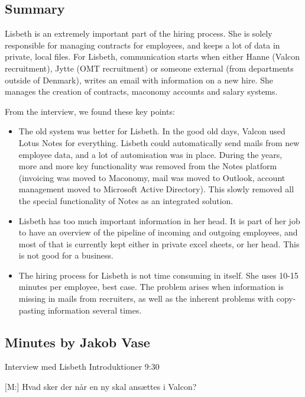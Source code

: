 \label{app:lisbeth}
\begin{linenumbers*}
\subsection{Summary}
Lisbeth is an extremely important part of the hiring process. She is solely responsible for managing contracts for employees, and keeps a lot of data in private, local files. 
For Lisbeth, communication starts when either Hanne (Valcon recruitment), Jytte (OMT recruitment) or someone external (from departments outside of Denmark), writes an email with information on a new hire.
She manages the creation of contracts, maconomy accounts and salary systems.

From the interview, we found these key points:
\begin{itemize}
	\item{The old system was better for Lisbeth.}
		In the good old days, Valcon used Lotus Notes for everything. Lisbeth could automatically send mails from new employee data, and a lot of automisation was in place. During the years, more and more key functionality was removed from the Notes platform (invoicing was moved to Maconomy, mail was moved to Outlook, account management moved to Microsoft Active Directory). This slowly removed all the special functionality of Notes as an integrated solution.
	\item{Lisbeth has too much important information in her head.}
		 It is part of her job to have an overview of the pipeline of incoming and outgoing employees, and most of that is currently kept either in private excel sheets, or her head. This is not good for a business.
	\item{The hiring process for Lisbeth is not time consuming in itself.}  
		She uses 10-15 minutes per employee, best case. The problem arises when information is missing in mails from recruiters, as well as the inherent problems with copy-pasting information several times.
\end{itemize}


\subsection{Minutes by Jakob Vase}

Interview med Lisbeth
Introduktioner
9:30

[M:] Hvad sker der når en ny skal ansættes i Valcon?


\end{linenumbers*}
